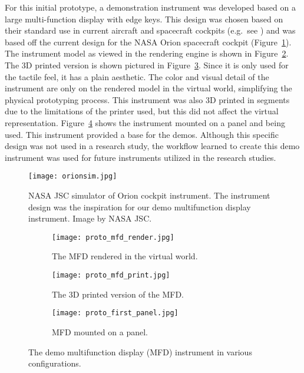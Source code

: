 For this initial prototype, a demonstration instrument was developed based on a large multi-function display with edge keys.
This design was chosen based on their standard use in current aircraft and spacecraft cockpits (e.g.\ see \citet{us_department_of_defense_department_1999}) and was based off the current design for the NASA Orion spacecraft cockpit (Figure~\ref{fig:orion_sim}).
The instrument model as viewed in the rendering engine is shown in Figure~\ref{fig:proto_mfd_render}.
The 3D printed version is shown pictured in Figure~\ref{fig:proto_mfd_print}.
Since it is only used for the tactile feel, it has a plain aesthetic.
The color and visual detail of the instrument are only on the rendered model in the virtual world, simplifying the physical prototyping process.
This instrument was also 3D printed in segments due to the limitations of the printer used, but this did not affect the virtual representation.
Figure~\ref{fig:proto_first_panel} shows the instrument mounted on a panel and being used.
This instrument provided a base for the demos.
Although this specific design was not used in a research study, the workflow learned to create this demo instrument was used for future instruments utilized in the research studies.

\begin{figure}
    \centering
    \texttt{[image: orionsim.jpg]}
    \caption{NASA JSC simulator of Orion cockpit instrument. The instrument design was the inspiration for our demo multifunction display instrument. Image by NASA JSC.}
    \label{fig:orion_sim}
\end{figure}

\mbox{}\hfill
\begin{figure}
    \centering
    \begin{subfigure}[t]{0.3\linewidth}
        \centering
        \texttt{[image: proto\_mfd\_render.jpg]}
        \caption{The MFD rendered in the virtual world.}
        \label{fig:proto_mfd_render}
    \end{subfigure}\hfill
    \begin{subfigure}[t]{0.3\linewidth}
        \centering
        \texttt{[image: proto\_mfd\_print.jpg]}
        \caption{The 3D printed version of the MFD.}
        \label{fig:proto_mfd_print}
    \end{subfigure}\hfill
    \begin{subfigure}[t]{0.3\linewidth}
        \centering
        \texttt{[image: proto\_first\_panel.jpg]}
        \caption{MFD mounted on a panel.}
        \label{fig:proto_first_panel}
    \end{subfigure}
    \caption{The demo multifunction display (MFD) instrument in various configurations.}
    \label{fig:proto_mfd}
\end{figure}
\hfill\mbox{}


